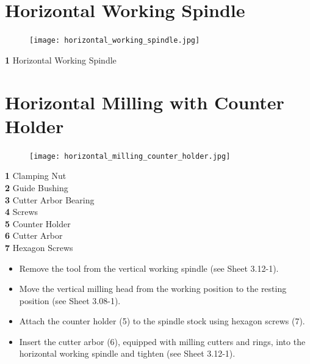 \section{Horizontal Working Spindle}

\begin{figure}[h]
    \centering
    \texttt{[image: horizontal\_working\_spindle.jpg]}
    \label{fig:horizontal_working_spindle}
\end{figure}

\noindent \textbf{1} \quad Horizontal Working Spindle

\vspace{.5cm}


\section{Horizontal Milling with Counter Holder}

\begin{figure}[h]
    \centering
    \texttt{[image: horizontal\_milling\_counter\_holder.jpg]}
    \label{fig:horizontal_milling_counter_holder}
\end{figure}

\noindent \textbf{1} \quad Clamping Nut \\
\textbf{2} \quad Guide Bushing \\
\textbf{3} \quad Cutter Arbor Bearing \\
\textbf{4} \quad Screws \\
\textbf{5} \quad Counter Holder \\
\textbf{6} \quad Cutter Arbor \\
\textbf{7} \quad Hexagon Screws

\vspace{0.3cm}

\begin{itemize}
    \item Remove the tool from the vertical working spindle (see Sheet 3.12-1).
    \item Move the vertical milling head from the working position to the resting position (see Sheet 3.08-1).
    \item Attach the counter holder (5) to the spindle stock using hexagon screws (7).
    \item Insert the cutter arbor (6), equipped with milling cutters and rings, into the horizontal working spindle and tighten (see Sheet 3.12-1).
\end{itemize}

